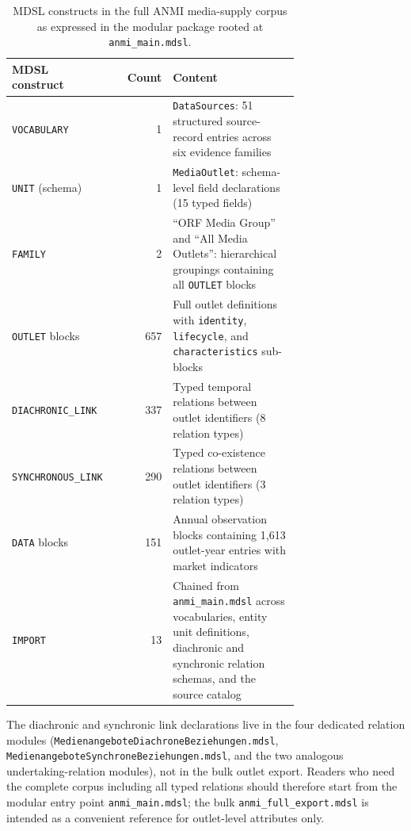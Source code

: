 \documentclass[11pt]{article}
\begin{document}
\begin{table}[t]
  \centering
  \small
  \begin{tabular}{>{\raggedright\arraybackslash}p{0.28\linewidth}r>{\raggedright\arraybackslash}p{0.44\linewidth}}
    \toprule
    MDSL construct & Count & Content \\
    \midrule
    \texttt{VOCABULARY} & 1 & \texttt{DataSources}: 51 structured source-record entries across six evidence families \\
    \texttt{UNIT} (schema) & 1 & \texttt{MediaOutlet}: schema-level field declarations (15 typed fields) \\
    \texttt{FAMILY} & 2 & ``ORF Media Group'' and ``All Media Outlets'': hierarchical groupings containing all \texttt{OUTLET} blocks \\
    \texttt{OUTLET} blocks & 657 & Full outlet definitions with \texttt{identity}, \texttt{lifecycle}, and \texttt{characteristics} sub-blocks \\
    \texttt{DIACHRONIC\_LINK} & 337 & Typed temporal relations between outlet identifiers (8 relation types) \\
    \texttt{SYNCHRONOUS\_LINK} & 290 & Typed co-existence relations between outlet identifiers (3 relation types) \\
    \texttt{DATA} blocks & 151 & Annual observation blocks containing 1{,}613 outlet-year entries with market indicators \\
    \texttt{IMPORT} & 13 & Chained from \texttt{anmi\_main.mdsl} across vocabularies, entity unit definitions, diachronic and synchronic relation schemas, and the source catalog \\
    \bottomrule
  \end{tabular}
  \caption{MDSL constructs in the full ANMI media-supply corpus as expressed in the modular package rooted at \texttt{anmi\_main.mdsl}.}
  \label{tab:objects}
\end{table}

The diachronic and synchronic link declarations live in the four dedicated relation modules (\texttt{MedienangeboteDiachroneBeziehungen.mdsl}, \texttt{MedienangeboteSynchroneBeziehungen.mdsl}, and the two analogous undertaking-relation modules), not in the bulk outlet export. Readers who need the complete corpus including all typed relations should therefore start from the modular entry point \texttt{anmi\_main.mdsl}; the bulk \texttt{anmi\_full\_export.mdsl} is intended as a convenient reference for outlet-level attributes only.
\end{document}
